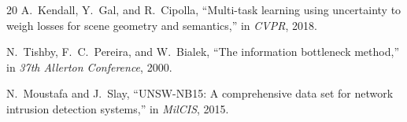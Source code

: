 \documentclass[conference]{IEEEtran}
\begin{document}
\begin{thebibliography}{20}
A.~Kendall, Y.~Gal, and R.~Cipolla,
``Multi-task learning using uncertainty to weigh losses for scene geometry
and semantics,'' in \textit{CVPR}, 2018.

N.~Tishby, F.~C.~Pereira, and W.~Bialek,
``The information bottleneck method,'' in \textit{37th Allerton Conference},
2000.

N.~Moustafa and J.~Slay,
``UNSW-NB15: A comprehensive data set for network intrusion detection systems,''
in \textit{MilCIS}, 2015.

\end{thebibliography}
\end{document}
